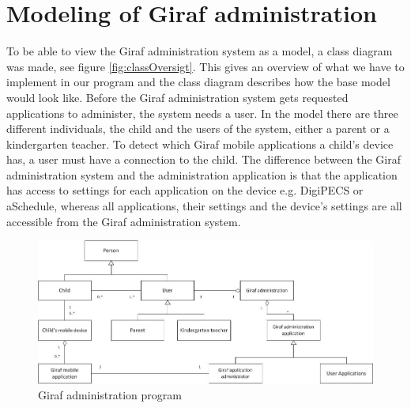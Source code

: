 \section{Modeling of Giraf administration}
To be able to view the Giraf administration system as a model, a class diagram was made, see figure \vref{fig:classOversigt}. This gives an overview of what we have to implement in our program and the class diagram describes how the base model would look like. Before the Giraf administration system gets requested applications to administer, the system needs a user. In the model there are three different individuals, the child and the users of the system, either a parent or a kindergarten teacher. To detect which Giraf mobile applications a child's device has, a user must have a connection to the child. The difference between the Giraf administration system and the administration application is that the application has access to settings for each application on the device e.g. DigiPECS or aSchedule, whereas all applications, their settings and the device's settings are all accessible from the Giraf administration system.
\pagebreak

\begin{figure}[!ht]
	\centering
		\includegraphics[width=1.00\textwidth]{img/classOversigt.jpg}
	\caption{Giraf administration program}
	\label{fig:classOversigt}
\end{figure}

